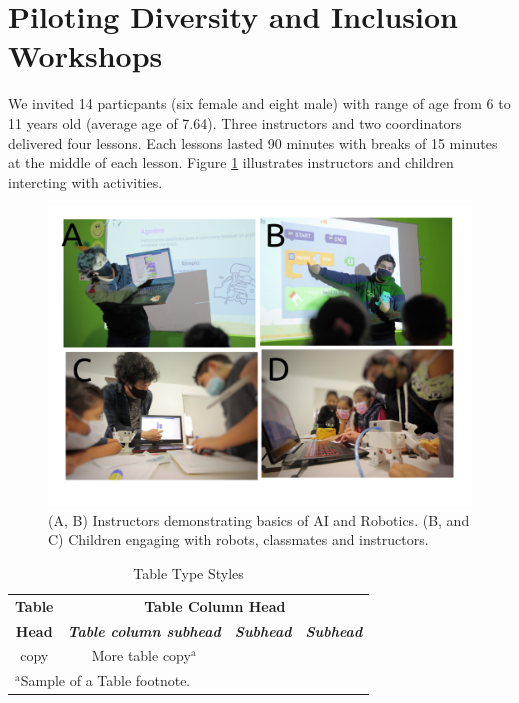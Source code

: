 \documentclass[conference]{IEEEtran}
\begin{document}
\section{Piloting Diversity and Inclusion Workshops}
We invited 14 particpants (six female and eight male) with range of age from 6 to 11 years old (average age of 7.64).
Three instructors and two coordinators delivered four lessons. 
Each lessons lasted 90 minutes with breaks of 15 minutes at the middle of each lesson. 
Figure \ref{fig:pilot} illustrates instructors and children intercting with activities. 
\begin{figure}[htbp]
    \centerline{\includegraphics[width=\linewidth]{piloting-workshops/versions/drawing-v00.png}}
    \caption{(A, B) Instructors demonstrating basics of AI and Robotics. 
    (B, and C) Children engaging with robots, classmates and instructors.}
    \label{fig:pilot}
\end{figure}


\begin{table}[htbp]
    \caption{Table Type Styles}
    \begin{center}
    \begin{tabular}{|c|c|c|c|}
    \hline
    \textbf{Table}&\multicolumn{3}{|c|}{\textbf{Table Column Head}} \\
    \cline{2-4} 
    \textbf{Head} & \textbf{\textit{Table column subhead}}& \textbf{\textit{Subhead}}& \textbf{\textit{Subhead}} \\
    \hline
    copy& More table copy$^{\mathrm{a}}$& &  \\
    \hline
    \multicolumn{4}{l}{$^{\mathrm{a}}$Sample of a Table footnote.}
    \end{tabular}
    \label{tab1}
    \end{center}
\end{table}
    
\end{document}
